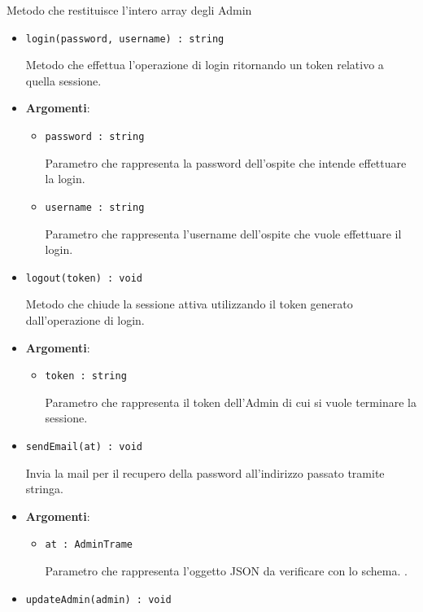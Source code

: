 \documentclass[../DefinizioneDiProdotto.tex]{subfiles}
\begin{document}
\begin{itemize}
\begin{itemize}
\begin{itemize}
	 Metodo che restituisce l'intero array degli Admin
	\end{itemize}\vspace{0.5em}
	\begin{itemize}
	\item \texttt{login(password, username) : string}\

	 Metodo che effettua l'operazione di login ritornando un token relativo a quella sessione.

	\item \textbf{Argomenti}:
	\begin{itemize}
	\item \texttt{password : string}\

	 Parametro che rappresenta la password dell'ospite che intende effettuare la login.
	\item \texttt{username : string}\

	 Parametro che rappresenta l'username dell'ospite che vuole effettuare il login.
	\end{itemize}
	\end{itemize}\vspace{0.5em}
	\begin{itemize}
	\item \texttt{logout(token) : void}\

	 Metodo che chiude la sessione attiva utilizzando il token generato dall'operazione di login.

	\item \textbf{Argomenti}:
	\begin{itemize}
	\item \texttt{token : string}\

	 Parametro che rappresenta il token dell'Admin di cui si vuole terminare la sessione.
	\end{itemize}
	\end{itemize}\vspace{0.5em}
	\begin{itemize}
	\item \texttt{sendEmail(at) : void}\

	 Invia la mail per il recupero della password all'indirizzo passato tramite stringa.

	\item \textbf{Argomenti}:
	\begin{itemize}
	\item \texttt{at : AdminTrame}\

	 Parametro che rappresenta l'oggetto JSON da verificare con lo schema. .
	\end{itemize}
	\end{itemize}\vspace{0.5em}
	\begin{itemize}
	\item \texttt{updateAdmin(admin) : void}\


\end{itemize}
\end{itemize}
\end{itemize}
\end{document}
